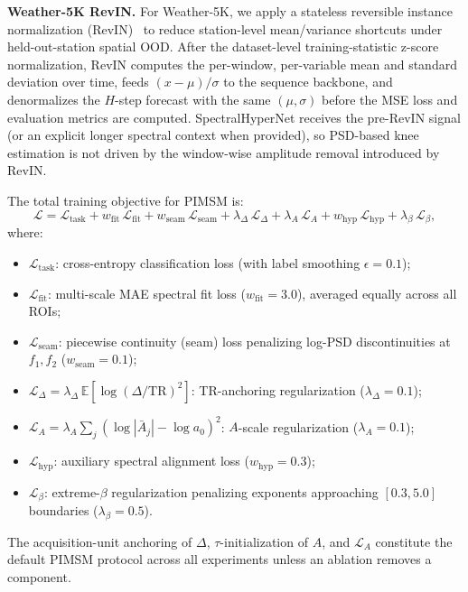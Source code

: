 \documentclass{article}
\begin{document}
\textbf{Weather-5K RevIN.}
For Weather-5K, we apply a stateless reversible instance normalization (RevIN)~\citep{kim2021reversible} to reduce station-level mean/variance shortcuts under held-out-station spatial OOD. After the dataset-level training-statistic z-score normalization, RevIN computes the per-window, per-variable mean and standard deviation over time, feeds $(x-\mu)/\sigma$ to the sequence backbone, and denormalizes the $H$-step forecast with the same $(\mu,\sigma)$ before the MSE loss and evaluation metrics are computed. SpectralHyperNet receives the pre-RevIN signal (or an explicit longer spectral context when provided), so PSD-based knee estimation is not driven by the window-wise amplitude removal introduced by RevIN.

The total training objective for PIMSM is:
\begin{equation}
\mathcal{L} = \mathcal{L}_{\mathrm{task}} + w_{\mathrm{fit}}\,\mathcal{L}_{\mathrm{fit}} + w_{\mathrm{seam}}\,\mathcal{L}_{\mathrm{seam}} + \lambda_\Delta\,\mathcal{L}_{\Delta} + \lambda_A\,\mathcal{L}_A + w_{\mathrm{hyp}}\,\mathcal{L}_{\mathrm{hyp}} + \lambda_\beta\,\mathcal{L}_{\beta},
\end{equation}
where:
\begin{itemize}
    \item $\mathcal{L}_{\mathrm{task}}$: cross-entropy classification loss (with label smoothing $\epsilon=0.1$);
    \item $\mathcal{L}_{\mathrm{fit}}$: multi-scale MAE spectral fit loss ($w_{\mathrm{fit}} = 3.0$), averaged equally across all ROIs;
    \item $\mathcal{L}_{\mathrm{seam}}$: piecewise continuity (seam) loss penalizing log-PSD discontinuities at $f_1, f_2$ ($w_{\mathrm{seam}} = 0.1$);
    \item $\mathcal{L}_{\Delta} = \lambda_\Delta\,\mathbb{E}[\log(\Delta/\mathrm{TR})^2]$: TR-anchoring regularization ($\lambda_\Delta = 0.1$);
    \item $\mathcal{L}_A = \lambda_A \sum_j (\log|\bar{A}_j| - \log a_0)^2$: $A$-scale regularization ($\lambda_A = 0.1$);
    \item $\mathcal{L}_{\mathrm{hyp}}$: auxiliary spectral alignment loss ($w_{\mathrm{hyp}} = 0.3$);
    \item $\mathcal{L}_{\beta}$: extreme-$\beta$ regularization penalizing exponents approaching $[0.3, 5.0]$ boundaries ($\lambda_{\beta} = 0.5$).
\end{itemize}
The acquisition-unit anchoring of $\Delta$, $\tau$-initialization of $A$, and $\mathcal{L}_A$ constitute the default PIMSM protocol across all experiments unless an ablation removes a component.
\end{document}
